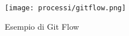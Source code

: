 \begin{figure}[!h] 
    \centering 
    \texttt{[image: processi/gitflow.png]} 
    \caption{Esempio di Git Flow }
  \end{figure}





